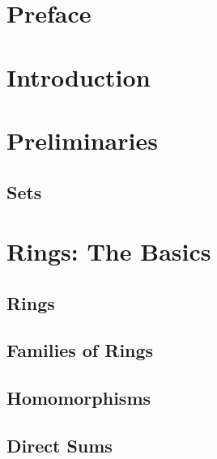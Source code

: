 \documentclass{memoir}
\begin{document}
\frontmatter%
  

  \tableofcontents%

  \chapter{Preface}
    

  \chapter{Introduction}
    

  \chapter{Preliminaries}
    \section{Sets}
      


\mainmatter
  \chapter{Rings: The Basics}
    \label{chap:rings}
    
    \newpage

    \section{Rings}
      \label{sec:rings}
      
      \newpage

    \section{Families of Rings}
      \label{sec:ring-fams}
      
      \newpage

    \section{Homomorphisms}
      \label{sec:ring-homs}
      
      \newpage

    \section{Direct Sums}
      \label{sec:direct-sums}
      
      \newpage
\end{document}
